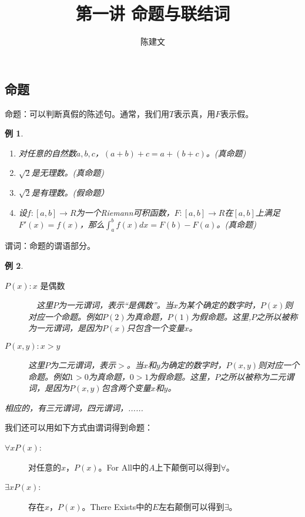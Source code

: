 \documentclass{article}
\newtheorem*{Example}{例}
\begin{document}
\begin{CJK}{UTF8}{gbsn}
  \title{第一讲 命题与联结词}
  \author{陈建文}
  \maketitle
  \section{命题}
  命题：可以判断真假的陈述句。通常，我们用$T$表示真，用$F$表示假。
  \begin{Example}\quad
    
    \begin{enumerate}
    \item 对任意的自然数$a,b,c$，$(a + b) + c = a + (b + c)$。(真命题)
    \item $\sqrt{2}$是无理数。(真命题)
    \item $\sqrt{2}$是有理数。(假命题）
    \item 设$f:[a,b] \to R$为一个Riemann可积函数，$F:[a,b] \to R$在$[a,b]$上满足$F'(x)=f(x)$，那么$\int_{a}^{b}f(x)dx = F(b) - F(a)$。(真命题)
     \end{enumerate}
  \end{Example}
  谓词：命题的谓语部分。
  
  \begin{Example}\quad
    
    \begin{description}
    \item     [$P(x): x$ 是偶数]　这里$P$为一元谓词，表示“是偶数”。当$x$为某个确定的数字时，$P(x)$则对应一个命题。例如$P(2)$为真命题，$P(1)$为假命题。这里,$P$之所以被称为一元谓词，是因为$P(x)$只包含一个变量$x$。
    \item     [$P(x,y): x >y$]  这里$P$为二元谓词，表示$>$。当$x$和$y$为确定的数字时，$P(x,y)$则对应一个命题。例如$1>0$为真命题，$0>1$为假命题。这里，$P$之所以被称为二元谓词，是因为$P(x,y)$包含两个变量$x$和$y$。
    \end{description}
相应的，有三元谓词，四元谓词，......
\end{Example}

我们还可以用如下方式由谓词得到命题：

\begin{description}
\item [$\forall x P(x)$:] 对任意的$x$，$P(x)$。For All中的$A$上下颠倒可以得到$\forall$。
\item [$\exists x P(x)$:] 存在$x$，$P(x)$。There Exists中的$E$左右颠倒可以得到$\exists$。
\end{description}
 

\end{CJK}
\end{document}
